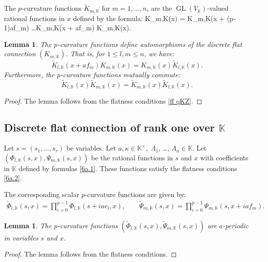 \documentclass[12pt]{amsart}
\newtheorem{lem}[thm]{Lemma}
\theoremstyle{definition} %
\numberwithin{equation}{section}
\theoremstyle{definition}
\let\ka\kappa
\let\La\Lambda
\let\leq\leqslant
\let\on\operatorname
\def\K{{\mathbb K}}
\begin{document}
The $p$-curvature functions $\tilde K_{m,\K}$ for $m=1,\dots,n$, are the
$\on{GL}(V_\K)$-valued rational functions in $x$ defined by the formula:
\bean
\label{cqkz}
\tilde K_{m,\K}(x) = K_{m,\K}(x + (p-1)af_m) \dots K_{m,\K}(x + af_m) K_{m,\K}(x).
\eean

\begin{lem}
\label{lem 4.2}
The $p$-curvature functions define automorphisms of the discrete flat connection $(K_{m,\K})$.
That is, for $1 \leq l, m \leq n$, we have:
\[
\tilde K_{l,\K}(x + af_m) K_{m,\K}(x) = K_{m,\K}(x) \tilde K_{l,\K}(x).
\]
Furthermore, the $p$-curvature functions mutually commute:
\[
\tilde K_{l,\K}(x) \tilde K_{m,\K}(x) = \tilde K_{m,\K}(x) \tilde K_{l,\K}(x).
\]

\end{lem}

\begin{proof}
The lemma follows from the flatness conditions \eqref{ff qKZ}.
\end{proof}

\subsection{Discrete flat connection of rank one  over $\K$}
\label{sec 5.5}

Let $s=(s_1,\dots,s_r)$ be variables.
Let $a, \ka \in \K^\times$,\ $\La_1$, \dots, $\La_n\in \K$.
Let $(\Phi_{l,\K}(s,x), \Psi_{m,\K}(s,x))$
be the rational functions in $s$ and $x$ with coefficients in $\K$ defined by formulas
\eqref{6a.1}. These functions satisfy the flatness conditions \eqref{6a.2}.

The corresponding scalar $p$-curvature functions are given by:
\begin{align*}
\tilde{\Phi}_{l,\K}(s,x) = \prod_{i=0}^{p-1} \Phi_{l,\K}(s + i ae_l, x),
\qquad
\tilde{\Psi}_{m,\K}(s,x) = \prod_{i=0}^{p-1} \Psi_{m,\K}(s, x + i a f_m).
\end{align*}

\begin{lem}
\label{lem 5.1}
The $p$-curvature functions $\left(\tilde{\Phi}_{l,\K}(s,x),\tilde{\Psi}_{m,\K}(s,x)\right)$
are $a$-periodic in variables $s$ and $x$.

\end{lem}

\begin{proof}
The lemma follows from the flatness conditions.
\end{proof}
\end{document}
